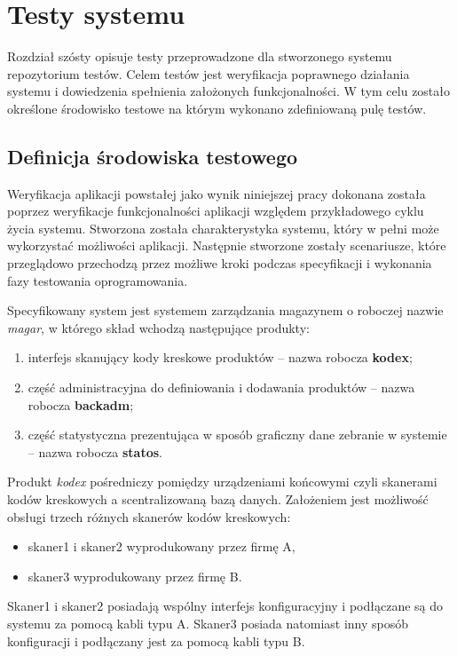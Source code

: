\chapter{Testy systemu}
Rozdział szósty opisuje testy przeprowadzone dla stworzonego systemu repozytorium testów. Celem testów jest weryfikacja poprawnego działania systemu i dowiedzenia spełnienia założonych funkcjonalności. W tym celu zostało określone środowisko testowe na którym wykonano zdefiniowaną pulę testów.

\section{Definicja środowiska testowego}

Weryfikacja aplikacji powstałej jako wynik niniejszej pracy dokonana została poprzez weryfikacje funkcjonalności aplikacji względem przykładowego cyklu życia systemu. Stworzona została charakterystyka systemu, który w pełni może wykorzystać możliwości aplikacji. Następnie stworzone zostały scenariusze, które przeglądowo przechodzą przez możliwe kroki podczas specyfikacji i wykonania fazy testowania oprogramowania.

Specyfikowany system jest systemem zarządzania magazynem o roboczej nazwie \textit{magar}, w którego skład wchodzą następujące produkty:
\begin{enumerate}
  \item interfejs skanujący kody kreskowe produktów -- nazwa robocza \textbf{kodex};
  \item część administracyjna do definiowania i dodawania produktów -- nazwa robocza \textbf{backadm};
  \item część statystyczna prezentująca w sposób graficzny dane zebranie w systemie -- nazwa robocza \textbf{statos}.
\end{enumerate}

Produkt \textit{kodex} pośredniczy pomiędzy urządzeniami końcowymi czyli skanerami kodów kreskowych a scentralizowaną bazą danych. Założeniem jest możliwość obsługi trzech różnych skanerów kodów kreskowych:
\begin{itemize}
  \item skaner1 i skaner2 wyprodukowany przez firmę A,
  \item skaner3 wyprodukowany przez firmę B.
\end{itemize}
Skaner1 i skaner2 posiadają wspólny interfejs konfiguracyjny i podłączane są do systemu za pomocą kabli typu A. Skaner3 posiada natomiast inny sposób konfiguracji i podłączany jest za pomocą kabli typu B.

